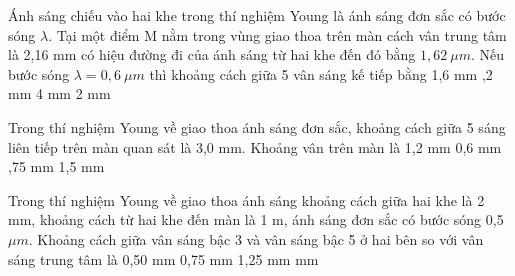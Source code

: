  
\begin{ex}%
Ánh sáng chiếu vào hai khe trong thí nghiệm Young là ánh sáng đơn sắc có bước sóng $\lambda$. Tại một điểm M nằm trong vùng giao thoa trên màn cách vân trung tâm là 2,16 mm có hiệu đường đi của ánh sáng từ hai khe đến đó bằng $1,62\ \mu m$. Nếu bước sóng $\lambda =0,6\ \mu m$ thì khoảng cách giữa 5 vân sáng kế tiếp bằng
\choice
{1,6 mm}
{,2 mm}
{4 mm}
{2 mm}
\end{ex} 
\begin{ex} %
 Trong thí nghiệm Young về giao thoa ánh sáng đơn sắc, khoảng cách giữa 5 sáng liên tiếp trên màn quan sát là 3,0 mm. Khoảng vân trên màn là
\choice
{1,2 mm}
{0,6 mm} 
{,75 mm}
{1,5 mm}
\end{ex} 



\begin{ex}%
Trong thí nghiệm Young về giao thoa ánh sáng khoảng cách giữa hai khe là 2 mm, khoảng cách từ hai khe đến màn là 1 m, ánh sáng đơn sắc có bước sóng 0,5 $\mu m $. Khoảng cách giữa vân sáng bậc 3 và vân sáng bậc 5 ở hai bên so với vân sáng trung tâm là
\choice
{0,50 mm}
{0,75 mm}
{1,25 mm}
{ mm}
\end{ex} 


